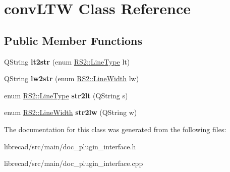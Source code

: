\hypertarget{classconvLTW}{\section{conv\-L\-T\-W Class Reference}
\label{classconvLTW}
}
\subsection*{Public Member Functions}
\begin{DoxyCompactItemize}
\item 
\hypertarget{classconvLTW_a9cce531e3403724ad9b960118a337e78}{Q\-String {\bfseries lt2str} (enum \hyperlink{classRS2_a6f3a82972c2d62456f6cacb74e14c95f}{R\-S2\-::\-Line\-Type} lt)}\label{classconvLTW_a9cce531e3403724ad9b960118a337e78}

\item 
\hypertarget{classconvLTW_a81ea6c6d6939c528b68b6066f68b92a3}{Q\-String {\bfseries lw2str} (enum \hyperlink{classRS2_a023485c482c5ee9e36b3dfad781adf29}{R\-S2\-::\-Line\-Width} lw)}\label{classconvLTW_a81ea6c6d6939c528b68b6066f68b92a3}

\item 
\hypertarget{classconvLTW_ac3678757063e30d62051876cd8cd3b96}{enum \hyperlink{classRS2_a6f3a82972c2d62456f6cacb74e14c95f}{R\-S2\-::\-Line\-Type} {\bfseries str2lt} (Q\-String s)}\label{classconvLTW_ac3678757063e30d62051876cd8cd3b96}

\item 
\hypertarget{classconvLTW_ab72bdc9d63d6d23a444b1c7e658bba44}{enum \hyperlink{classRS2_a023485c482c5ee9e36b3dfad781adf29}{R\-S2\-::\-Line\-Width} {\bfseries str2lw} (Q\-String w)}\label{classconvLTW_ab72bdc9d63d6d23a444b1c7e658bba44}

\end{DoxyCompactItemize}


The documentation for this class was generated from the following files\-:\begin{DoxyCompactItemize}
\item 
librecad/src/main/doc\-\_\-plugin\-\_\-interface.\-h\item 
librecad/src/main/doc\-\_\-plugin\-\_\-interface.\-cpp\end{DoxyCompactItemize}
